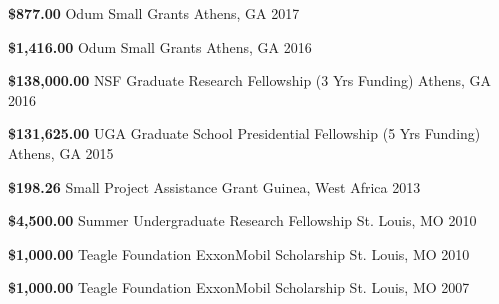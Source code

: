 \begin{cvhonors}

    \cvhonor
      {\textbf{\$877.00}} %
      {Odum Small Grants } %
      {Athens, GA} %
      {2017} %

  \cvhonor
    {\textbf{\$1,416.00}} %
    {Odum Small Grants } %
    {Athens, GA} %
    {2016} %

  \cvhonor
    {\textbf{\$138,000.00}} %
    {NSF Graduate Research Fellowship (3 Yrs Funding)} %
    {Athens, GA} %
    {2016} %

  \cvhonor
    {\textbf{\$131,625.00}} %
    {UGA Graduate School Presidential Fellowship (5 Yrs Funding)} %
    {Athens, GA} %
    {2015} %

  \cvhonor
    {\textbf{\$198.26}} %
    {Small Project Assistance Grant} %
    {Guinea, West Africa} %
    {2013} %

  \cvhonor
    {\textbf{\$4,500.00}} %
    {Summer Undergraduate Research Fellowship} %
    {St. Louis, MO} %
    {2010} %

  \cvhonor
    {\textbf{\$1,000.00}} %
    {Teagle Foundation ExxonMobil Scholarship} %
    {St. Louis, MO} %
    {2010} %

  \cvhonor
    {\textbf{\$1,000.00}} %
    {Teagle Foundation ExxonMobil Scholarship} %
    {St. Louis, MO} %
    {2007} %

\end{cvhonors}

